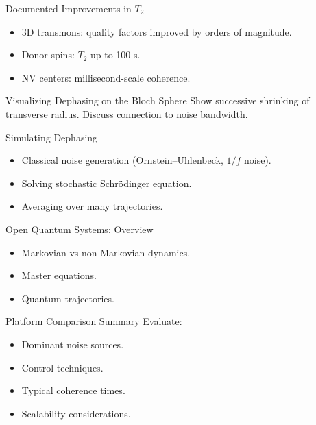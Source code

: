 \documentclass{beamer}
\begin{document}
  \begin{frame}{Documented Improvements in $T_2$}
    \begin{itemize}
    \item 3D transmons: quality factors improved by orders of magnitude.
    \item Donor spins: $T_2$ up to 100 s.
    \item NV centers: millisecond-scale coherence.
    \end{itemize}
  \end{frame}

  \begin{frame}{Visualizing Dephasing on the Bloch Sphere}
    Show successive shrinking of transverse radius.
    Discuss connection to noise bandwidth.
  \end{frame}

  \begin{frame}{Simulating Dephasing}
    \begin{itemize}
    \item Classical noise generation (Ornstein–Uhlenbeck, $1/f$ noise).
    \item Solving stochastic Schrödinger equation.
    \item Averaging over many trajectories.
    \end{itemize}
  \end{frame}

  \begin{frame}{Open Quantum Systems: Overview}
    \begin{itemize}
    \item Markovian vs non-Markovian dynamics.
    \item Master equations.
    \item Quantum trajectories.
    \end{itemize}
  \end{frame}

  \begin{frame}{Platform Comparison Summary}
    Evaluate:
    \begin{itemize}
    \item Dominant noise sources.
    \item Control techniques.
    \item Typical coherence times.
    \item Scalability considerations.
    \end{itemize}
  \end{frame}
\end{document}
